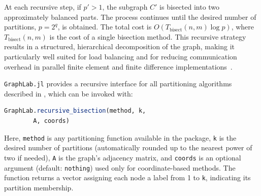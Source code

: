    At each recursive step, if $p'>1$, the subgraph $C'$ is bisected into two approximately balanced parts. The process continues
    until the desired number of partitions, $p = 2^q$, is obtained.
    The total cost is $O(T_{\text{bisect}}(n, m) \log p)$, where $ T_{\text{bisect}}(n, m)$ is the cost of a single bisection method.
    This recursive strategy results in a structured,
    hierarchical decomposition of the graph, making it particularly well suited for load balancing and for reducing communication overhead in parallel finite element and finite difference implementations~\cite{doi:10.1137/S1064827593255135}.
    
    

    \texttt{GraphLab.jl} provides a recursive interface for all partitioning algorithms described in , which can be invoked with:

    \begin{lstlisting}[language=Julia]
    GraphLab.recursive_bisection(method, k, 
        A, coords)
    \end{lstlisting}

    Here, \texttt{method} is any partitioning function available in the package, \texttt{k} is the desired number of partitions (automatically rounded up to the nearest power of two if needed), \texttt{A} is the graph's adjacency matrix, and \texttt{coords} is an optional argument (default: \texttt{nothing}) used only for coordinate-based methods. The function returns a vector assigning each node a label from 1 to \texttt{k}, indicating its partition membership.


